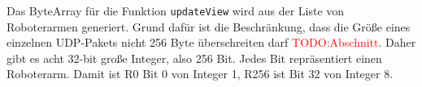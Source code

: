 
Das ByteArray für die Funktion \texttt{updateView} wird aus der Liste von Roboterarmen generiert. Grund dafür ist die Beschränkung, dass die Größe eines einzelnen UDP-Pakets nicht 256 Byte überschreiten darf \textcolor{red}{TODO:Abschnitt}. Daher gibt es acht 32-bit große Integer, also 256 Bit. Jedes Bit repräsentiert einen Roboterarm. Damit ist R0 Bit 0 von Integer 1, R256 ist Bit 32 von Integer 8.











